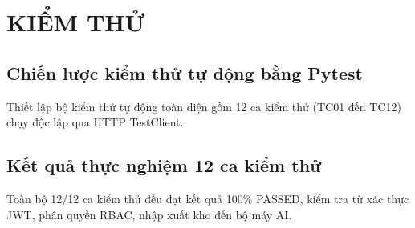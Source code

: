 \chapter{KIỂM THỬ}
\label{ch:10}

\section{Chiến lược kiểm thử tự động bằng Pytest}
Thiết lập bộ kiểm thử tự động toàn diện gồm 12 ca kiểm thử (TC01 đến TC12) chạy độc lập qua HTTP TestClient.

\section{Kết quả thực nghiệm 12 ca kiểm thử}
Toàn bộ 12/12 ca kiểm thử đều đạt kết quả 100\% PASSED, kiểm tra từ xác thực JWT, phân quyền RBAC, nhập xuất kho đến bộ máy AI.
